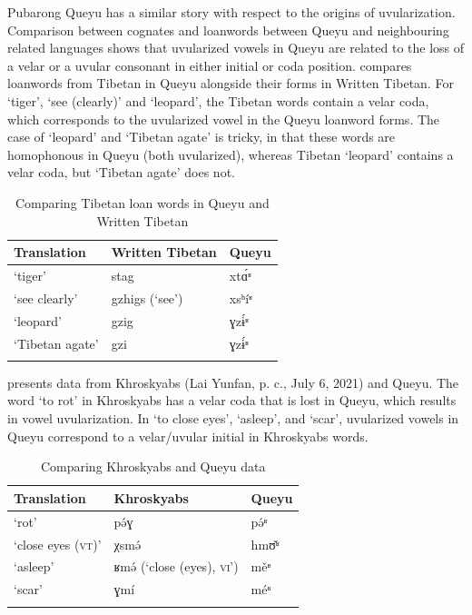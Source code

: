 \documentclass[output=paper]{langscibook}
\begin{document}
Pubarong Queyu has a similar story with respect to the origins of uvularization. Comparison between cognates and loanwords between Queyu and neighbouring related languages shows that uvularized vowels in Queyu are related to the loss of a velar or a uvular consonant in either initial or coda position.  compares loanwords from Tibetan in Queyu alongside their forms in Written Tibetan. For ‘tiger’, ‘see (clearly)’ and ‘leopard’, the Tibetan words contain a velar coda, which corresponds to the uvularized vowel in the Queyu loanword forms. The case of ‘leopard’ and ‘Tibetan agate’ is tricky, in that these words are homophonous in Queyu (both uvularized), whereas Tibetan ‘leopard’ contains a velar coda, but ‘Tibetan agate’ does not.

\begin{table}
\caption{Comparing Tibetan loan words in Queyu and Written Tibetan}
\label{tab:guan:18}
\begin{tabularx}{\textwidth}{XXl}
\lsptoprule
Translation & Written Tibetan & Queyu\\
\midrule
{‘tiger’} & {stag} & {xtɑ́ʶ}\\
{‘see clearly’} & {gzhigs (‘see’)} & {xsʰíʶ}\\
{‘leopard’} & {gzig} & {ɣzɨ́ʶ}\\
{‘Tibetan agate’} & {gzi} & {ɣzɨ́ʶ}\\
\lspbottomrule
\end{tabularx}
\end{table}


 presents data from Khroskyabs (Lai Yunfan, p. c., July 6, 2021) and Queyu. The word ‘to rot’ in Khroskyabs has a velar coda that is lost in Queyu, which results in vowel uvularization. In ‘to close eyes’, ‘asleep’, and ‘scar’, uvularized vowels in Queyu correspond to a velar/uvular initial in Khroskyabs words.

\begin{table}
\caption{Comparing Khroskyabs and Queyu data}
\label{tab:guan:19}
\begin{tabularx}{\textwidth}{XXl}
\lsptoprule
Translation & Khroskyabs & Queyu\\
\midrule
{‘rot’} & {pə́ɣ} & {pə́ʶ}\\
{‘close eyes (\textsc{vt)}’} & {χsmə́} & {hmʊ̌ʶ}\\
{‘asleep’} & {ʁmə́  (‘close (eyes), \textsc{vi}’)} & {m\v{e}ʶ}\\
{‘scar’} & {ɣmí} & {méʶ}\\
\lspbottomrule
\end{tabularx}
\end{table}
\end{document}
